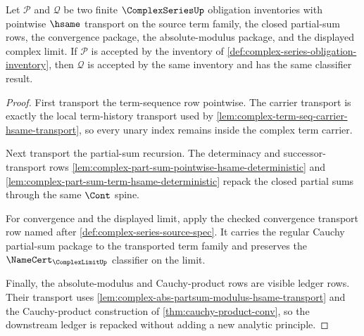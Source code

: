 \begin{theorem}
\label{thm:complex-series-obligation-inventory-stability}
Let $\mathcal P$ and $\mathcal Q$ be two finite $\ComplexSeriesUp$ obligation inventories with pointwise $\hsame$ transport on the source term family, the closed partial-sum rows, the convergence package, the absolute-modulus package, and the displayed complex limit. If $\mathcal P$ is accepted by the inventory of \autoref{def:complex-series-obligation-inventory}, then $\mathcal Q$ is accepted by the same inventory and has the same classifier result.
\end{theorem}
\begin{proof}
First transport the term-sequence row pointwise. The carrier transport is exactly the local term-history transport used by \autoref{lem:complex-term-seq-carrier-hsame-transport}, so every unary index remains inside the complex term carrier.

Next transport the partial-sum recursion. The determinacy and successor-transport rows \autoref{lem:complex-part-sum-pointwise-hsame-deterministic} and \autoref{lem:complex-part-sum-term-hsame-deterministic} repack the closed partial sums through the same $\Cont$ spine.

For convergence and the displayed limit, apply the checked convergence transport row named after \autoref{def:complex-series-source-spec}. It carries the regular Cauchy partial-sum package to the transported term family and preserves the $\NameCert_{\ComplexLimitUp}$ classifier on the limit.

Finally, the absolute-modulus and Cauchy-product rows are visible ledger rows. Their transport uses \autoref{lem:complex-abs-partsum-modulus-hsame-transport} and the Cauchy-product construction of \autoref{thm:cauchy-product-conv}, so the downstream ledger is repacked without adding a new analytic principle.
\end{proof}

